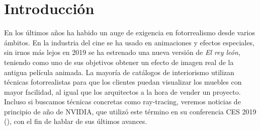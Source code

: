\documentclass{scrbook}
\begin{document}
\frontmatter %


                    
                     
   
            


                    
               

\mainmatter %

\setpartpreamble[c][0.75\linewidth]{%
	\bigskip %
}


\newpage



\chapter{Introducción}
En los últimos años ha habido un auge de exigencia en fotorrealismo desde varios ámbitos. En la industria del cine se ha usado en animaciones y efectos especiales, sin irnos más lejos en 2019 se ha estrenado una nueva versión de \textit{El rey león}, teniendo como uno de sus objetivos obtener un efecto de imagen real de la antigua película animada. La mayoría de catálogos de interiorismo utilizan técnicas fotorrealistas para que los clientes puedan visualizar los muebles con mayor facilidad, al igual que los arquitectos a la hora de vender un proyecto. Incluso si buscamos técnicas concretas como ray-tracing, veremos noticias de principio de año de NVIDIA, que utilizó este término en su conferencia CES 2019 (\cite{nvidia}), con el fin de hablar de sus últimos avances. 
\end{document}
